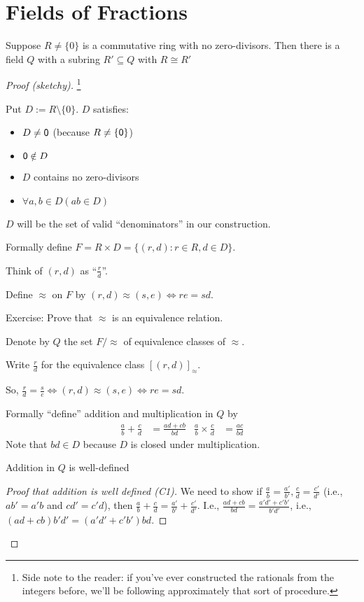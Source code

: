 \documentclass[notes.tex]{subfiles}
\begin{document}
\chapter{Fields of Fractions}
\begin{theorem}
	Suppose $R \ne \{0\}$ is a commutative ring
	with no zero-divisors. Then there is a field $Q$ with a subring $R'\subseteq Q$ with $R\cong R'$
\end{theorem}
\begin{proof}[Proof (sketchy)]
\footnote{Side note to the reader: if you've ever constructed the rationals from the integers before, we'll be following approximately that sort of procedure.}

Put $D := R \setminus\{0\}$. $D$ satisfies:
\begin{itemize}
	\item $D\ne \mathsf{0}$ (because $R\ne\{\mathsf{0}\}$)
	\item $\mathsf{0}\notin D$
	\item $D$ contains no zero-divisors
	\item $\forall a, b\in D (ab\in D)$
\end{itemize}
$D$ will be the set of valid ``denominators'' in our construction.

Formally define $F = R\times D = \{(r, d) : r\in R, d\in D\}$.

Think of $(r, d)$ as ``$\frac{r}{d}$''.

Define $\approx$ on $F$ by $(r, d) \approx (s, e) \iff re = sd$.

Exercise: Prove that $\approx$ is an equivalence relation.

Denote by $Q$ the set $F/\approx$ of equivalence classes of $\approx$.

Write $\frac{r}{d}$ for the equivalence class $[(r, d)]_\approx$.

So, $\frac{r}{d} = \frac{s}{e} \iff (r, d)\approx(s, e) \iff re = sd$.

Formally ``define'' addition and multiplication in $Q$ by
\begin{align*}
	\frac{a}{b} + \frac{c}{d} &= \frac{ad+cb}{bd}
	& \frac{a}{b} \times \frac{c}{d} &= \frac{ac}{bd}
\end{align*}
Note that $bd\in D$ because $D$ is closed under multiplication.

\begin{claim}[1]
	Addition in $Q$ is well-defined
\end{claim}
\begin{proof}[Proof that addition is well defined (C1)]
	We need to show if $\frac{a}{b} = \frac{a'}{b'}, \frac{c}{d}= \frac{c'}{d'}$ (i.e., $ab' = a'b$ and $cd' = c'd$), then $\frac{a}{b} + \frac{c}{d} = \frac{a'}{b'}+\frac{c'}{d'}$. I.e., $\frac{ad+cb}{bd} = \frac{a'd'+c'b'}{b'd'}$, i.e., $(ad+cb)b'd' = (a'd'+c'b')bd$.


\end{proof}
\end{proof}
\end{document}
